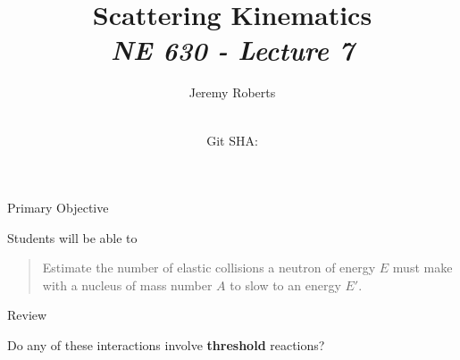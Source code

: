\documentclass[aspectratio=1610]{beamer}
\title{Scattering Kinematics \\
       {\small\it NE 630 - Lecture 7}}
\date{ \\ {\footnotesize Git SHA: }}
\author{Jeremy Roberts}
\begin{document}
\begin{frame}
\titlepage
\end{frame}
 
 
\begin{frame}{Primary Objective}

Students will be able to 

\vfill

\begin{quote}
\textcolor{wcprimary}{Estimate the number of elastic collisions a neutron of energy $E$ must make with a nucleus of mass number $A$ to slow to an energy $E'$.}
\end{quote}

\vfill 

\end{frame}

\begin{frame}{Review}



\begin{figure}[h]
    \centering
    \resizebox{0.95\textwidth}{!}{}
\end{figure}

Do any of these interactions involve {\bf threshold} reactions?
\end{frame}
\end{document}
